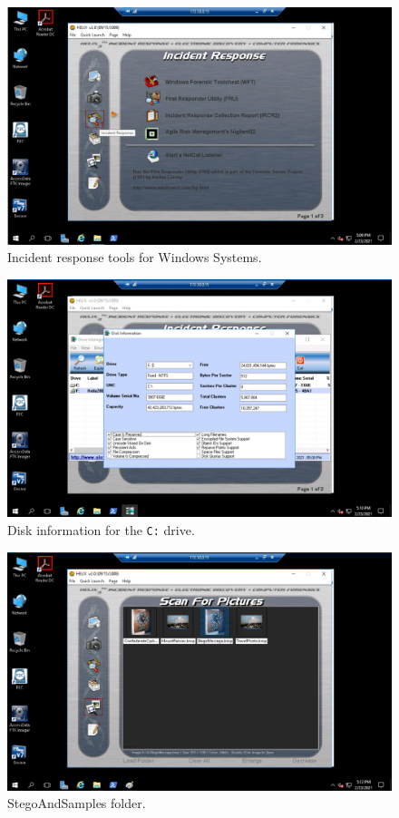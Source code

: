 \begin{figure}[H]
    \centering
    \includegraphics[width=\linewidth]{figures/Part 1 Step 5.png}
    \caption{Incident response tools for Windows Systems.}
\end{figure}

\begin{figure}[H]
    \centering
    \includegraphics[width=\linewidth]{figures/Part 1 Step 8.png}
    \caption{Disk information for the {\tt C:} drive.}
\end{figure}

\begin{figure}[H]
    \centering
    \includegraphics[width=\linewidth]{figures/Part 1 Step 11.png}
    \caption{StegoAndSamples folder.}
\end{figure}

